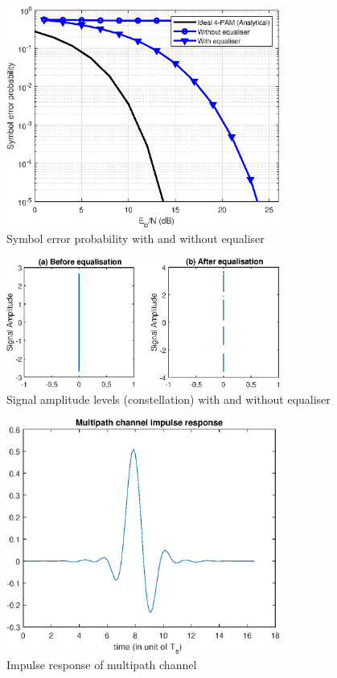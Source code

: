 \documentclass[11pt]{article}
\begin{document}
\begin{figure}[H]
    \centering
    \includegraphics[width=0.8\textwidth]{plots/symbol_error_eq.eps}
    \caption{Symbol error probability with and without equaliser\label{eq_err}}
\end{figure}

\begin{figure}[H]
    \centering
    \includegraphics[width=0.8\textwidth]{plots/constellation_eq.eps}
    \caption{Signal amplitude levels (constellation) with and without
        equaliser\label{constellation}}
\end{figure}

\begin{figure}[H]
    \centering
    \includegraphics[width=0.8\textwidth]{plots/channel_impulse.eps}
    \caption{Impulse response of multipath channel}
\end{figure}
\end{document}
